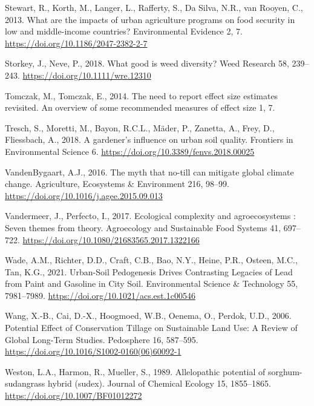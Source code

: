 \documentclass[
  12pt,
]{article}
\newlength{\cslhangindent}
\newlength{\cslentryspacingunit} %
\newenvironment{CSLReferences}[2] %
 {%
  \setlength{\parindent}{0pt}
  \ifodd #1
  \let\oldpar\par
  \def\par{\hangindent=\cslhangindent\oldpar}
  \fi
  \setlength{\parskip}{#2\cslentryspacingunit}
 }%
 {}
\begin{document}
\begin{CSLReferences}{1}{0}
\leavevmode{}%
Stewart, R., Korth, M., Langer, L., Rafferty, S., Da Silva, N.R., van Rooyen, C., 2013. What are the impacts of urban agriculture programs on food security in low and middle-income countries? Environmental Evidence 2, 7. \url{https://doi.org/10.1186/2047-2382-2-7}

\leavevmode{}%
Storkey, J., Neve, P., 2018. What good is weed diversity? Weed Research 58, 239--243. \url{https://doi.org/10.1111/wre.12310}

\leavevmode{}%
Tomczak, M., Tomczak, E., 2014. The need to report effect size estimates revisited. {An} overview of some recommended measures of effect size 1, 7.

\leavevmode{}%
Tresch, S., Moretti, M., Bayon, R.C.L., Mäder, P., Zanetta, A., Frey, D., Fliessbach, A., 2018. A gardener's influence on urban soil quality. Frontiers in Environmental Science 6. \url{https://doi.org/10.3389/fenvs.2018.00025}

\leavevmode{}%
VandenBygaart, A.J., 2016. The myth that no-till can mitigate global climate change. Agriculture, Ecosystems \& Environment 216, 98--99. \url{https://doi.org/10.1016/j.agee.2015.09.013}

\leavevmode{}%
Vandermeer, J., Perfecto, I., 2017. Ecological complexity and agroecosystems : Seven themes from theory. Agroecology and Sustainable Food Systems 41, 697--722. \url{https://doi.org/10.1080/21683565.2017.1322166}

\leavevmode{}%
Wade, A.M., Richter, D.D., Craft, C.B., Bao, N.Y., Heine, P.R., Osteen, M.C., Tan, K.G., 2021. Urban-{Soil Pedogenesis Drives Contrasting Legacies} of {Lead} from {Paint} and {Gasoline} in {City Soil}. Environmental Science \& Technology 55, 7981--7989. \url{https://doi.org/10.1021/acs.est.1c00546}

\leavevmode{}%
Wang, X.-B., Cai, D.-X., Hoogmoed, W.B., Oenema, O., Perdok, U.D., 2006. Potential {Effect} of {Conservation Tillage} on {Sustainable Land Use}: {A Review} of {Global Long-Term Studies}. Pedosphere 16, 587--595. \url{https://doi.org/10.1016/S1002-0160(06)60092-1}

\leavevmode{}%
Weston, L.A., Harmon, R., Mueller, S., 1989. Allelopathic potential of sorghum-sudangrass hybrid (sudex). Journal of Chemical Ecology 15, 1855--1865. \url{https://doi.org/10.1007/BF01012272}


\end{CSLReferences}
\end{document}
